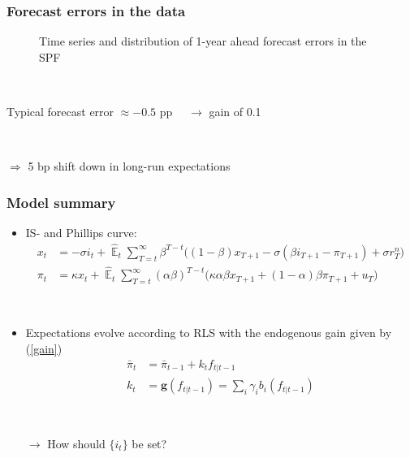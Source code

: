 \documentclass[10pt]{beamer}
\def \myFigPath {../../../figures/}
\DeclareMathOperator{\E}{\mathbb{E}}
\def\fignameFeSPF{fe_SPF_command_anchoring_in_data_19_Sep_2020_11_45_59}
\def\fignameFeSPFhist{fe_SPF_hist_command_anchoring_in_data_19_Sep_2020_11_45_59}
\begin{document}
\begin{frame}
	\frametitle{Forecast errors in the data}

\begin{figure}[h!]
\caption{Time series and distribution of 1-year ahead forecast errors in the SPF}
\label{fe_in_data}
\end{figure}

\

\pause
Typical forecast error $\approx -0.5$ pp \pause $\quad \rightarrow$ gain of 0.1 

\

\pause $\Rightarrow$ 5 bp shift down in long-run expectations

\end{frame}


\begin{frame}
	\frametitle{Model summary}
	\label{aggregate_LOMS}
\begin{itemize}
\item IS- and Phillips curve:	
 \begin{align}
x_t &=  -\sigma i_t +\hat{\E}_t \sum_{T=t}^{\infty} \beta^{T-t }\big( (1-\beta)x_{T+1} - \sigma(\beta i_{T+1} - \pi_{T+1}) +\sigma r_T^n \big)  \label{NKIS}  \\
\pi_t &= \kappa x_t +\hat{\E}_t \sum_{T=t}^{\infty} (\alpha\beta)^{T-t }\big( \kappa \alpha \beta x_{T+1} + (1-\alpha)\beta \pi_{T+1} + u_T\big) \label{NKPC}  
\end{align}
\hfill \hyperlink{derivations}{} \hyperlink{ALMs}{}

\

\item  Expectations evolve according to RLS with the endogenous gain given by (\ref{gain})
\begin{align*}
\bar{\pi}_{t}  & =\bar{\pi}_{t-1} +k_t  f_{t|t-1} \tag{16} \\
 k_t & = \mathbf{g}(f_{t|t-1}) = \sum_i\gamma_i b_i(f_{t|t-1}) \tag{20}
\end{align*}

\

\item[$\rightarrow$] How should $\{ i_t \}$ be set?
\end{itemize}



\end{frame}
\end{document}
